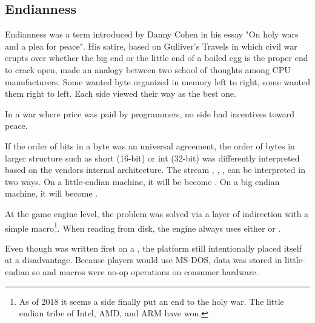 \subsection{Endianness}
Endianness was a term introduced by Danny Cohen in his essay "On holy wars and a plea for peace". His satire, based on Gulliver's Travels in which civil war erupts over whether the big end or the little end of a boiled egg is the proper end to crack open, made an analogy between two school of thoughts among CPU manufacturers. Some wanted byte organized in memory left to right, some wanted them right to left. Each side viewed their way as the best one.\\
\par
In a war where price was paid by programmers, no side had incentives toward peace.\\
\par
If the order of bits in a byte was an universal agreement, the order of bytes in larger structure such as short (16-bit) or int (32-bit) was differently interpreted based on the vendors internal architecture. The stream , , ,  can be interpreted in two ways. On a little-endian machine, it will be become . On a big endian machine, it will become .\\
\par
{}
\par
At the game engine level, the problem was solved via a layer of indirection with a simple macro\footnote{As of 2018 it seems a side finally put an end to the holy war. The little endian tribe of Intel, AMD, and ARM have won.}. When reading from disk, the engine always uses either  or .\\
\par
{}
\par
{}
\par
Even though \doom was written first on a \NeXT, the platform still intentionally placed itself at a disadvantage. Because players would use MS-DOS, data was stored in little-endian so  and  macros were no-op operations on consumer hardware.\\

\par

